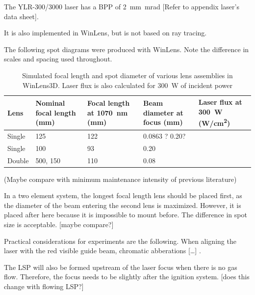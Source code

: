                 The YLR-300/3000 laser has a BPP of \qty{2}{mm.mrad} [Refer to appendix laser's data sheet].

                
                
                It is also implemented in WinLens, but is not based on ray tracing.

                The following spot diagrams were produced with WinLens. Note the difference in scales and spacing used throughout.

            

                \begin{table}[!ht]
                    \centering
                    \caption{Simulated focal length and spot diameter of various lens assemblies in WinLens3D. Laser flux is also calculated for \qty{300}{W} of incident power}
                    \label{tab:laser flux}
                    \begin{tabularx}{\textwidth}{@{}lX<{\raggedright}X<{\raggedright}X<{\raggedright}X<{\raggedright}@{}}
                    \toprule
                    Lens & Nominal focal length (\unit{mm}) & Focal length at \qty{1070}{nm} (\unit{mm})& Beam diameter at focus (\unit{mm}) & Laser flux at \qty{300}{W} (\unit{W/cm^2}) \\ \midrule
                    Single & 125           &  122   &    0.0863 ?  0.20?     &  \\
                    Single & 100           &  93   &    0.20   &  \\
                    Double & 500, 150      &  110    &    0.08   &  \\
                    \bottomrule
                    \end{tabularx}
                \end{table}

                (Maybe compare with minimum maintenance intensity of previous literature)

                In a two element system, the longest focal length lens should be placed first, as the diameter of the beam entering the second lens is maximized. However, it is placed after here because it is impossible to mount before. The difference in spot size is acceptable. [maybe compare?]

                Practical considerations for experiments are the following. When aligning the laser with the red visible guide beam, chromatic abberations [\dots] \cite{hechtUnderstandingLasersEntry2019}.

                The LSP will also be formed upstream of the laser focus when there is no gas flow. Therefore, the focus needs to be slightly after the ignition system. [does this change with flowing LSP?]